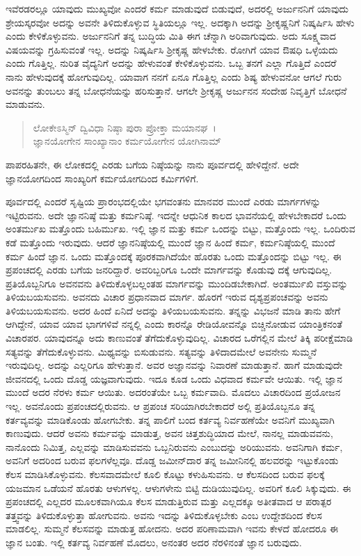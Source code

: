 ಇವೆರಡರಲ್ಲೂ ಯಾವುದು ಮುಖ್ಯವೋ ಎಂದರೆ ಕರ್ಮ ಮಾಡುವುದೆ ಬಿಡುವುದೆ, ಅದರಲ್ಲಿ ಅರ್ಜುನನಿಗೆ ಯಾವುದು ಶ್ರೇಯಸ್ಕರವೋ ಅದನ್ನು ಅವನೇ ತಿಳಿದುಕೊಳ್ಳುವ ಸ್ಥಿತಿಯಲ್ಲೂ ಇಲ್ಲ. ಅದಕ್ಕಾಗಿ ಅದನ್ನು ಶ‍್ರೀಕೃಷ್ಣನಿಗೆ ನಿಷ್ಕರ್ಷಿಸಿ ಹೇಳು ಎಂದು ಕೇಳಿಕೊಳ್ಳುವನು. ಅರ್ಜುನನಿಗೆ ತನ್ನ ಬುದ್ಧಿಯ ಮಿತಿ ಈಗ ಚೆನ್ನಾಗಿ ಅರಿವಾಗುವುದು. ಅದು ಸೂಕ್ಷ್ಮವಾದ ವಿಷಯವನ್ನು ಗ್ರಹಿಸುವಂತೆ ಇಲ್ಲ. ಅದನ್ನು ನಿಷ್ಕರ್ಷಿಸಿ ಶ‍್ರೀಕೃಷ್ಣ ಹೇಳಬೇಕು. ರೋಗಿಗೆ ಯಾವ ಔಷಧಿ ಒಳ್ಳೆಯದು ಎಂದು ಗೊತ್ತಿಲ್ಲ. ನುರಿತ ವೈದ್ಯನಿಗೆ ಅದನ್ನು ಹೇಳುವಂತೆ ಕೇಳಿಕೊಳ್ಳುವನು. ಒಬ್ಬ ತನಗೆ ಎಲ್ಲಾ ಗೊತ್ತಿದೆ ಎಂದರೆ ನಾನು ಹೇಳುವುದಕ್ಕೆ ಹೋಗುವುದಿಲ್ಲ. ಯಾವಾಗ ನನಗೆ ಏನೂ ಗೊತ್ತಿಲ್ಲ ಎಂದು ಶಿಷ್ಯ ಹೇಳುವನೋ ಆಗಲೆ ಗುರು ಅವನನ್ನು ತುಂಬಲು ತನ್ನ ಬೋಧನೆಯನ್ನು ಹರಿಸುತ್ತಾನೆ. ಆಗಲೇ ಶ‍್ರೀಕೃಷ್ಣ ಅರ್ಜುನನ ಸಂದೇಹ ನಿವೃತ್ತಿಗೆ ಬೋಧನೆ ಮಾಡುವನು.

\begin{verse}
ಲೋಕೇಽಸ್ಮಿನ್ ದ್ವಿವಿಧಾ ನಿಷ್ಠಾ ಪುರಾ ಪ್ರೋಕ್ತಾ ಮಯಾನಘ~।\\ಜ್ಞಾನಯೋಗೇನ ಸಾಂಖ್ಯಾನಾಂ ಕರ್ಮಯೋಗೇನ ಯೋಗಿನಾಮ್ 
\end{verse}

{\small ಪಾಪರಹಿತನೇ, ಈ ಲೋಕದಲ್ಲಿ ಎರಡು ಬಗೆಯ ನಿಷ್ಠೆಯನ್ನು ನಾನು ಪೂರ್ವದಲ್ಲಿ ಹೇಳಿದ್ದೇನೆ. ಅದೇ ಜ್ಞಾನಯೋಗದಿಂದ ಸಾಂಖ್ಯರಿಗೆ ಕರ್ಮಯೋಗದಿಂದ ಕರ್ಮಿಗಳಿಗೆ.}

ಪೂರ್ವದಲ್ಲಿ ಎಂದರೆ ಸೃಷ್ಟಿಯ ಪ್ರಾರಂಭದಲ್ಲಿಯೇ ಭಗವಂತನು ಮಾನವರ ಮುಂದೆ ಎರಡು ಮಾರ್ಗಗಳನ್ನು ಇಟ್ಟಿರುವನು. ಅದೇ ಜ್ಞಾನನಿಷ್ಠೆ ಮತ್ತು ಕರ್ಮನಿಷ್ಠೆ. ಇದನ್ನೇ ಆಧುನಿಕ ಕಾಲದ ಭಾವನೆಯಲ್ಲಿ ಹೇಳಬೇಕಾದರೆ ಒಂದು ಅಂತರ್ಮುಖ ಮತ್ತೊಂದು ಬಹಿರ್ಮುಖ. ಇಲ್ಲಿ ಜ್ಞಾನ ಮತ್ತು ಕರ್ಮ ಒಂದನ್ನು ಬಿಟ್ಟು, ಮತ್ತೊಂದು ಇಲ್ಲ. ಒಂದಿರುವ ಕಡೆ ಮತ್ತೊಂದು ಇರುವುದು. ಆದರೆ ಜ್ಞಾನನಿಷ್ಠೆಯಲ್ಲಿ ಮುಂದೆ ಜ್ಞಾನ ಹಿಂದೆ ಕರ್ಮ, ಕರ್ಮನಿಷ್ಠೆಯಲ್ಲಿ ಮುಂದೆ ಕರ್ಮ ಹಿಂದೆ ಜ್ಞಾನ. ಒಂದು ಮತ್ತೊಂದಕ್ಕೆ ಪೂರಕವಾಗಿದೆಯೇ ಹೊರತು ಒಂದು ಮತ್ತೊಂದನ್ನು ಬಿಟ್ಟು ಇಲ್ಲ. ಈ ಪ್ರಪಂಚದಲ್ಲಿ ಎರಡು ಬಗೆಯ ಜನರಿದ್ದಾರೆ. ಅವರಿಬ್ಬರಿಗೂ ಒಂದೇ ಮಾರ್ಗವನ್ನು ಕೊಡುವು ದಕ್ಕೆ ಆಗುವುದಿಲ್ಲ. ಪ್ರತಿಯೊಬ್ಬನಿಗೂ ಅವನವನು ತಿಳಿದುಕೊಳ್ಳಬಲ್ಲಂತಹ ಮಾರ್ಗವನ್ನು ಮುಂದಿಡಬೇಕಾಗಿದೆ. ಅಂತರ್ಮುಖಿ ವಸ್ತುವನ್ನು ತಿಳಿಯಬಯಸುವನು. ಅವನದು ವಿಚಾರ ಪ್ರಧಾನವಾದ ಮಾರ್ಗ. ಹೊರಗೆ ಇರುವ ದೃಶ್ಯಪ್ರಪಂಚವನ್ನು ಅವನು ತಿಳಿಯಬಯಸುವನು. ಅದರ ಹಿಂದೆ ಏನಿದೆ ಅದನ್ನು ತಿಳಿಯಬಯಸುವನು. ತನ್ನನ್ನು ವಿಭಜನೆ ಮಾಡಿ ತಾನು ಹೇಗೆ ಆಗಿದ್ದೇನೆ, ಯಾವ ಯಾವ ಭಾಗಗಳಿವೆ ನನ್ನಲ್ಲಿ ಎಂದು ಕಾರನ್ನೊ ರೇಡಿಯೋವನ್ನೊ ಬಿಚ್ಚಿನೋಡುವ ಯಾಂತ್ರಿಕನಂತೆ ವಿಚಾರಪರ. ಯಾವುದನ್ನೂ ಅದು ಕಾಣುವಂತೆ ತೆಗೆದುಕೊಳ್ಳುವುದಿಲ್ಲ. ವಿಚಾರದ ಒರೆಗಲ್ಲಿನ ಮೇಲೆ ತಿಕ್ಕಿ ಪರೀಕ್ಷೆಮಾಡಿ ಸತ್ಯವನ್ನು ತೆಗೆದುಕೊಳ್ಳುವನು. ಮಿಥ್ಯವನ್ನು ಬಿಸುಡುವನು. ಸತ್ಯವನ್ನು ತಿಳಿದಾದಮೇಲೆ ಅವನೇನು ಸುಮ್ಮನೆ ಇರುವುದಿಲ್ಲ. ಅದನ್ನು ಎಲ್ಲರಿಗೂ ಹೇಳುತ್ತಾನೆ. ಅವರ ಅಜ್ಞಾನವನ್ನು ನಿವಾರಣೆ ಮಾಡುತ್ತಾನೆ. ಹಾಗೆ ಮಾಡುವುದೇ ಜೀವನದಲ್ಲಿ ಒಂದು ದೊಡ್ಡ ಯಜ್ಞವಾಗುವುದು. ಇದೂ ಕೂಡ ಒಂದು ವಿಧವಾದ ಕರ್ಮವೇ ಆಯಿತು. ಇಲ್ಲಿ ಜ್ಞಾನ ಮುಂದೆ ಅದರ ನೆರಳು ಕರ್ಮ ಆಯಿತು. ಅದರಂತೆಯೇ ಒಬ್ಬ ಕರ್ಮವಾದಿ. ಮೊದಲು ವಿಚಾರದಿಂದ ಪ್ರಯೋಜನ ಇಲ್ಲ. ಅವನೊಂದು ಪ್ರಪಂಚದಲ್ಲಿರುವನು. ಆ ಪ್ರಪಂಚ ಸರಿಯಾಗಿರಬೇಕಾದರೆ ಅಲ್ಲಿ ಪ್ರತಿಯೊಬ್ಬನೂ ತನ್ನ ಕರ್ತವ್ಯವನ್ನು ಮಾಡಿಕೊಂಡು ಹೋಗಬೇಕು. ತನ್ನ ಪಾಲಿಗೆ ಬಂದ ಕರ್ತವ್ಯ ನಿರ್ವಹಣೆಯೇ ಅವನಿಗೆ ಮುಖ್ಯವಾಗಿ ಕಾಣುವುದು. ಆದರೆ ಅವನು ಕರ್ಮವನ್ನು ಮಾಡುತ್ತ, ಅವನ ಚಿತ್ತಶುದ್ಧಿಯಾದ ಮೇಲೆ, ನಾನಲ್ಲ ಮಾಡುವವನು, ನಾನೊಂದು ನಿಮಿತ್ತ, ಎಲ್ಲವನ್ನು ಮಾಡಿಸುವವನು ಒಬ್ಬನಿರುವನು ಎಂಬುದನ್ನು ಅರಿಯುವನು. ಅವನಿಗಾಗಿ ಕರ್ಮ, ಅವನಿಗೆ ಅದರಿಂದ ಬರುವ ಫಲಗಳೆಲ್ಲವೂ. ದೊಡ್ಡ ಜಮೀನ್​ದಾರ ತನ್ನ ಜಮೀನಿನಲ್ಲಿ ಹಲವರನ್ನು ಇಟ್ಟುಕೊಂಡು ಕೆಲಸ ಮಾಡಿಸಿಕೊಳ್ಳುವನು. ಕೆಲಸವಾದಮೇಲೆ ಕೂಲಿ ಕೊಟ್ಟು ಕಳುಹಿಸುವನು. ಆ ಕೆಲಸದಿಂದ ಬರುವ ಫಲಕ್ಕೆ ಯಜಮಾನ ಒಡೆಯನೆ ಹೊರತು ಆಳುಗಳಲ್ಲ. ಆಳುಗಳೇನು ಬಿಟ್ಟಿ ದುಡಿಯುವುದಿಲ್ಲ. ಅವರಿಗೆ ಕೂಲಿ ಸಿಕ್ಕುವುದು. ಈ ಪ್ರಪಂಚದಲ್ಲಿ ಎಲ್ಲದರ ಮೂಲಕವಾಗಿಯೂ ಕೆಲಸ ಮಾಡುತ್ತಿರುವ ಮತ್ತು ಎಲ್ಲದಕ್ಕೂ ಅತೀತವಾದ ಆ ಪರಾತ್ಪರ ತತ್ತ್ವವನ್ನು ತಿಳಿದುಕೊಳ್ಳುತ್ತಾ ಹೋಗುವನು. ಅವನು ಇದನ್ನು ತಿಳಿದುಕೊಳ್ಳಬೇಕು ಎಂಬ ಉದ್ದೇಶದಿಂದ ಕೆಲಸ ಮಾಡಲಿಲ್ಲ. ಸುಮ್ಮನೆ ಕೆಲಸವನ್ನು ಮಾಡುತ್ತ ಹೋದನು. ಅದರ ಪರಿಣಾಮವಾಗಿ ಇವನು ಕೇಳದೆ ಹೋದರೂ ಈ ಜ್ಞಾನ ಬಂತು. ಇಲ್ಲಿ ಕರ್ತವ್ಯ ನಿರ್ವಹಣೆ ಮೊದಲು, ಅನಂತರ ಅದರ ನೆರಳಿನಂತೆ ಜ್ಞಾನ ಬರುವುದು.

